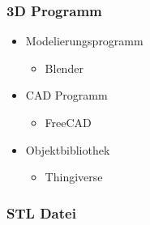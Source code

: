 {
\begin{frame}
  \frametitle{3D Programm}
  \begin{itemize}
    \item Modelierungsprogramm \pause
    \begin{itemize}
      \item Blender \pause
    \end{itemize}
    \item CAD Programm \pause
    \begin{itemize}
      \item FreeCAD \pause
    \end{itemize}
    \item Objektbibliothek \pause
    \begin{itemize}
      \item Thingiverse
    \end{itemize}
  \end{itemize}
\end{frame}
}
{
\begin{frame}
  \frametitle{STL Datei}
\end{frame}
}
